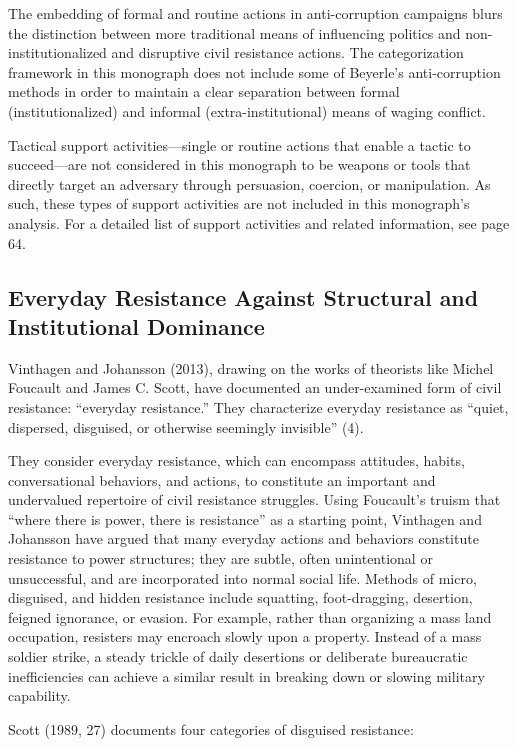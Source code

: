 \documentclass[twoside,a4paper,12pt,fleqn,openany]{extbook}
\begin{document}
The embedding of formal and routine actions in anti-corruption campaigns blurs the distinction between more traditional means of influencing politics and non-institutionalized and disruptive civil resistance actions. The categorization framework in this monograph does not include some of Beyerle’s anti-corruption methods in order to maintain a clear separation between formal (institutionalized) and informal (extra-institutional) means of waging conflict.

Tactical support activities—single or routine actions that enable a tactic to succeed—are not considered in this monograph to be weapons or tools that directly target an adversary through persuasion, coercion, or manipulation. As such, these types of support activities are not included in this monograph’s analysis. For a detailed list of support activities and related information, see page 64.

\subsection*{Everyday Resistance Against Structural and Institutional Dominance}

Vinthagen and Johansson (2013), drawing on the works of theorists like Michel Foucault and James C. Scott, have documented an under-examined form of civil resistance: “everyday resistance.” They characterize everyday resistance as “quiet, dispersed, disguised, or otherwise seemingly invisible” (4).

They consider everyday resistance, which can encompass attitudes, habits, conversational behaviors, and actions, to constitute an important and undervalued repertoire of civil resistance struggles. Using Foucault’s truism that “where there is power, there is resistance” as a starting point, Vinthagen and Johansson have argued that many everyday actions and behaviors constitute resistance to power structures; they are subtle, often unintentional or unsuccessful, and are incorporated into normal social life. Methods of micro, disguised, and hidden resistance include squatting, foot-dragging, desertion, feigned ignorance, or evasion. For example, rather than organizing a mass land occupation, resisters may encroach slowly upon a property. Instead of a mass soldier strike, a steady trickle of daily desertions or deliberate bureaucratic inefficiencies can achieve a similar result in breaking down or slowing military capability.

Scott (1989, 27) documents four categories of disguised resistance:
\end{document}
